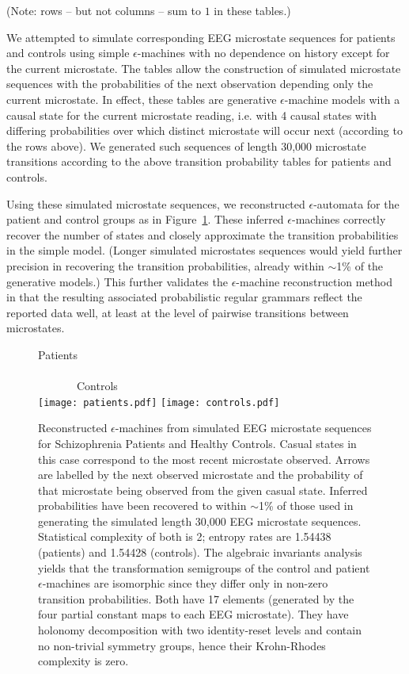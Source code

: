 \documentclass[journal]{IEEEtran}
\begin{document}
(Note: rows -- but not columns -- sum to $1$ in these tables.)


 We attempted to simulate corresponding EEG microstate sequences for patients and controls using simple $\epsilon$-machines with
no dependence on history except for the current microstate.
The tables allow the construction of simulated microstate sequences with the probabilities of the next observation depending only the current microstate.
In effect, these tables are generative $\epsilon$-machine models with a causal state for the current microstate reading, i.e. with 4 causal states with differing probabilities
over which distinct microstate will occur next (according to the rows above). 
We generated such sequences of length 30,000 microstate transitions according to the above transition probability tables for patients and controls.

Using these simulated microstate sequences,
 we reconstructed $\epsilon$-automata for the patient and control groups as in Figure~\ref{schizophrenia}.   
These inferred $\epsilon$-machines correctly recover the number of states and closely approximate the transition probabilities in the simple model. (Longer simulated 
 microstates sequences would yield further precision in recovering the transition probabilities, already within $\sim$1\%  of the generative models.)
 This further validates the $\epsilon$-machine reconstruction method in that 
the resulting associated probabilistic regular grammars reflect the reported data well, at least at the level of pairwise transitions between microstates.

\begin{figure}[h]
\begin{center}
Patients \ \ \  \ \ \ \    \ \ \ \ \   \ \ \ \ \  \ \ \ \ \ \ \ \ \ \ \ \ \ \ \ \ \ \ \ \ \ \ \ \ \ \ \ \ \ \ \  \ \ \ \ \ \ \ \ \ \ \ \ \ \ \ \ \ \ \ Controls\\
 \texttt{[image: patients.pdf]}
  \texttt{[image: controls.pdf]}
   \end{center}
 \caption{Reconstructed $\epsilon$-machines from simulated EEG microstate sequences for Schizophrenia Patients and Healthy Controls. Casual states in this
 case correspond to the most recent microstate observed. Arrows are labelled by the next observed microstate and the probability of that microstate being observed from the given casual state. Inferred probabilities have been recovered to within $\sim$1\%  of those used in generating the simulated length 30,000 EEG microstate
  sequences. Statistical complexity of both is 2; entropy rates are 1.54438 (patients) and 1.54428 (controls). 
  The algebraic invariants analysis yields that the transformation semigroups of the control and patient $\epsilon$-machines are isomorphic since they differ only in non-zero transition probabilities. Both have 17 elements  (generated by the four partial constant maps to each EEG microstate). They have holonomy decomposition with two identity-reset levels  and contain no non-trivial symmetry groups, hence their Krohn-Rhodes complexity is zero.}
 \label{schizophrenia}
 \end{figure}
 
\end{document}
